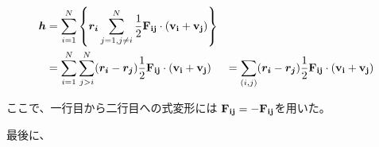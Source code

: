 \begin{align}
  \label{eq:heat_flow_expanded}
  \bm{h} &= \sum_{i=1}^{N} \left\{
              \bm{r_i}\sum_{j=1, j \neq i }^{N} \frac{1}{2} \bf{F}_{ij} \cdot (\bf{v}_i + \bf{v}_j)
            \right\} \\
         &= \sum_{i=1}^{N} \sum_{j>i}^{N}
              (\bm{r_i} - \bm{r_j}) \frac{1}{2} \bf{F}_{ij} \cdot (\bf{v}_i + \bf{v}_j)
         &= \sum_{(i, j)}
              (\bm{r_i} - \bm{r_j}) \frac{1}{2} \bf{F}_{ij} \cdot (\bf{v}_i + \bf{v}_j)
\end{align}

ここで、一行目から二行目への式変形には $\bf{F}_{ij} = - \bf{F}_{ij}$を用いた。

最後に、
